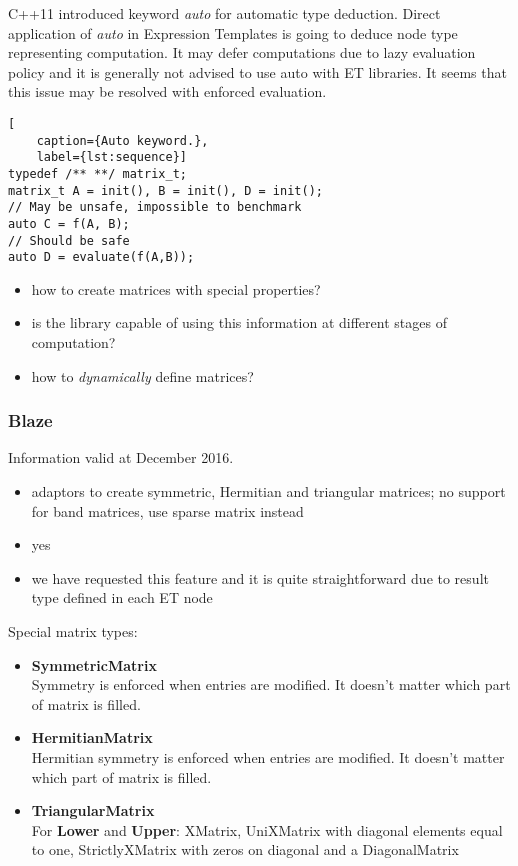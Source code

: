 \documentclass{article}
\begin{document}
C++11 introduced keyword \textit{auto} for automatic type deduction. Direct application of \textit{auto} in Expression Templates is going to deduce node type representing computation. It may defer computations due to lazy evaluation policy and it is generally not advised to use auto with ET libraries\cite{eigenAuto}. It seems that this issue may be resolved with enforced evaluation.

\begin{code}[h]
\begin{lstlisting}[
    caption={Auto keyword.},
    label={lst:sequence}]
typedef /** **/ matrix_t;
matrix_t A = init(), B = init(), D = init();
// May be unsafe, impossible to benchmark
auto C = f(A, B);
// Should be safe
auto D = evaluate(f(A,B));
\end{lstlisting}
\end{code}

\begin{itemize}
\item how to create matrices with special properties?
\item is the library capable of using this information at different stages of computation? 
\item how to \textit{dynamically} define matrices?
\end{itemize}

\subsubsection{Blaze}
Information valid at December 2016.
\begin{itemize}
\item adaptors to create symmetric, Hermitian and triangular matrices\cite{blazeAdaptors}; no support for band matrices, use sparse matrix instead\cite{blazeBand}
\item yes\cite{blazeEval}
\item we have requested this feature and it is quite straightforward due to result type defined in each ET node\cite{blazeEval}
\end{itemize}

Special matrix types:
\begin{itemize}
\item \textbf{SymmetricMatrix} \\
Symmetry is enforced when entries are modified. It doesn't matter which part of matrix is filled.
\item \textbf{HermitianMatrix} \\
Hermitian symmetry is enforced when entries are modified. It doesn't matter which part of matrix is filled.
\item \textbf{TriangularMatrix} \\
For \textbf{Lower} and \textbf{Upper}: XMatrix, UniXMatrix with diagonal elements equal to one, StrictlyXMatrix with zeros on diagonal and a DiagonalMatrix 
\end{itemize}
\end{document}
